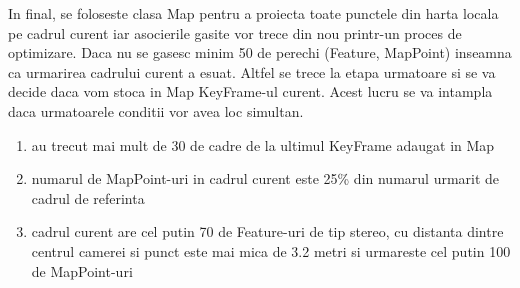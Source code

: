 \documentclass[12pt,a4paper]{report}
\begin{document}
In final, se foloseste clasa Map pentru a proiecta toate punctele din harta locala pe cadrul curent
iar asocierile gasite vor trece din nou printr-un proces de optimizare. Daca nu se gasesc minim
50 de perechi (Feature, MapPoint) inseamna ca urmarirea cadrului curent a esuat. Altfel se 
trece la etapa urmatoare si se va decide daca vom stoca in Map KeyFrame-ul curent. Acest lucru 
se va intampla daca urmatoarele conditii vor avea loc simultan.    
\begin{enumerate}
    \item au trecut mai mult de 30 de cadre de la ultimul KeyFrame adaugat in Map
    \item numarul de MapPoint-uri in cadrul curent este 25\% din numarul urmarit de cadrul de referinta
    \item cadrul curent are cel putin 70 de Feature-uri de tip stereo, cu distanta dintre centrul
camerei si punct este mai mica de 3.2 metri si urmareste cel putin 100 de MapPoint-uri
\end{enumerate}
\end{document}
